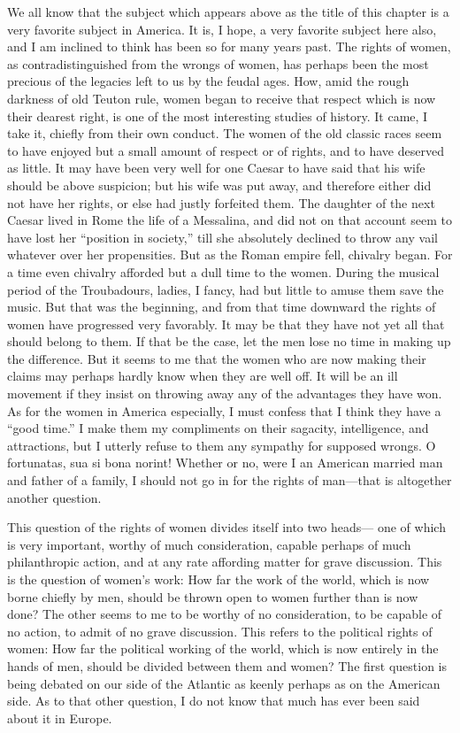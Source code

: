 We all know that the subject which appears above as the title of
this chapter is a very favorite subject in America.  It is, I hope,
a very favorite subject here also, and I am inclined to think has
been so for many years past.  The rights of women, as
contradistinguished from the wrongs of women, has perhaps been the
most precious of the legacies left to us by the feudal ages.  How,
amid the rough darkness of old Teuton rule, women began to receive
that respect which is now their dearest right, is one of the most
interesting studies of history.  It came, I take it, chiefly from
their own conduct.  The women of the old classic races seem to have
enjoyed but a small amount of respect or of rights, and to have
deserved as little.  It may have been very well for one Caesar to
have said that his wife should be above suspicion; but his wife was
put away, and therefore either did not have her rights, or else had
justly forfeited them.  The daughter of the next Caesar lived in
Rome the life of a Messalina, and did not on that account seem to
have lost her ``position in society,'' till she absolutely declined
to throw any vail whatever over her propensities.  But as the Roman
empire fell, chivalry began.  For a time even chivalry afforded but
a dull time to the women.  During the musical period of the
Troubadours, ladies, I fancy, had but little to amuse them save the
music.  But that was the beginning, and from that time downward the
rights of women have progressed very favorably.  It may be that
they have not yet all that should belong to them.  If that be the
case, let the men lose no time in making up the difference.  But it
seems to me that the women who are now making their claims may
perhaps hardly know when they are well off.  It will be an ill
movement if they insist on throwing away any of the advantages they
have won.  As for the women in America especially, I must confess
that I think they have a ``good time.''  I make them my compliments
on their sagacity, intelligence, and attractions, but I utterly
refuse to them any sympathy for supposed wrongs.  O fortunatas, sua
si bona norint!  Whether or no, were I an American married man and
father of a family, I should not go in for the rights of man---that
is altogether another question.

This question of the rights of women divides itself into two heads---%
one of which is very important, worthy of much consideration,
capable perhaps of much philanthropic action, and at any rate
affording matter for grave discussion.  This is the question of
women's work: How far the work of the world, which is now borne
chiefly by men, should be thrown open to women further than is now
done?  The other seems to me to be worthy of no consideration, to
be capable of no action, to admit of no grave discussion.  This
refers to the political rights of women: How far the political
working of the world, which is now entirely in the hands of men,
should be divided between them and women?  The first question is
being debated on our side of the Atlantic as keenly perhaps as on
the American side.  As to that other question, I do not know that
much has ever been said about it in Europe.

